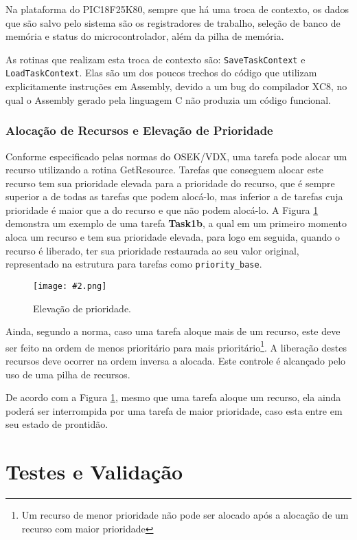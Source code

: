 \documentclass[conference,compsoc]{IEEEtran}
\newcommand{\reffig}[1]{Figura \ref{fig:#1}}
\newcommand{\figura}[5][Extraido de:]{
	\begin{figure}[h!tb]
		\centering
		\caption{#3.}
		\texttt{[image: \#2.png]}
		\ifthenelse{\isempty{#5}}{}{%
			\\ #1 \cite{#5}.
		}	
		\label{fig:#2}
	\end{figure}
}
\begin{document}
Na plataforma do PIC18F25K80, sempre que há uma troca de contexto, os dados que são salvo pelo sistema são os registradores de trabalho, seleção de banco de memória e status do microcontrolador, além da pilha de memória.

As rotinas que realizam esta troca de contexto são: \texttt{SaveTaskContext} e \texttt{LoadTaskContext}. Elas são um dos poucos trechos do código que utilizam explicitamente instruções em Assembly, devido a um bug do compilador XC8, no qual o Assembly gerado pela linguagem C não produzia um código funcional.

\subsubsection{Alocação de Recursos e Elevação de Prioridade}

Conforme especificado pelas normas do OSEK/VDX, uma tarefa pode alocar um recurso utilizando a rotina GetResource. Tarefas que conseguem alocar este recurso tem sua prioridade elevada para a prioridade do recurso, que é sempre superior a de todas as tarefas que podem alocá-lo, mas inferior a de tarefas cuja prioridade é maior que a do recurso e que não podem alocá-lo. A \reffig{cap4_resource_alloc} demonstra um exemplo de uma tarefa \textbf{Task1b}, a qual em um primeiro momento aloca um recurso e tem sua prioridade elevada, para logo em seguida, quando o recurso é liberado, ter sua prioridade restaurada ao seu valor original, representado na estrutura para tarefas como \texttt{priority\_base}.

\figura{cap4_resource_alloc}{Elevação de prioridade}{7cm}{}

Ainda, segundo a norma, caso uma tarefa aloque mais de um recurso, este deve ser feito na ordem de menos prioritário para mais prioritário\footnote{Um recurso de menor prioridade não pode ser alocado após a alocação de um recurso com maior prioridade}. A liberação destes recursos deve ocorrer na ordem inversa a alocada. Este controle é alcançado pelo uso de uma pilha de recursos.

De acordo com a \reffig{cap4_resource_alloc}, mesmo que uma tarefa aloque um recurso, ela ainda poderá ser interrompida por uma tarefa de maior prioridade, caso esta entre em seu estado de prontidão.

\section{Testes e Validação}
\end{document}
